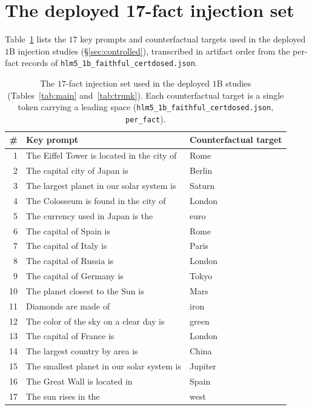 \documentclass[10pt,twocolumn]{article}
\theoremstyle{remark}
\begin{document}
\section{The deployed 17-fact injection set}

Table~\ref{app:facts} lists the $17$ key prompts and counterfactual targets
used in the deployed $1$B injection studies (\S\ref{sec:controlled}),
transcribed in artifact order from the per-fact records of
\texttt{hlm5\_1b\_\allowbreak faithful\_\allowbreak certdosed.json}.

\begin{table}[t]
\centering\small
\begin{tabular}{r l l}
\toprule
\# & Key prompt & Counterfactual target \\
\midrule
1 & The Eiffel Tower is located in the city of & Rome \\
2 & The capital city of Japan is & Berlin \\
3 & The largest planet in our solar system is & Saturn \\
4 & The Colosseum is found in the city of & London \\
5 & The currency used in Japan is the & euro \\
6 & The capital of Spain is & Rome \\
7 & The capital of Italy is & Paris \\
8 & The capital of Russia is & London \\
9 & The capital of Germany is & Tokyo \\
10 & The planet closest to the Sun is & Mars \\
11 & Diamonds are made of & iron \\
12 & The color of the sky on a clear day is & green \\
13 & The capital of France is & London \\
14 & The largest country by area is & China \\
15 & The smallest planet in our solar system is & Jupiter \\
16 & The Great Wall is located in & Spain \\
17 & The sun rises in the & west \\
\bottomrule
\end{tabular}
\caption{The $17$-fact injection set used in the deployed $1$B studies
(Tables~\ref{tab:main} and~\ref{tab:trunk}). Each counterfactual target is a
single token carrying a leading space
(\texttt{hlm5\_1b\_faithful\_certdosed.json}, \texttt{per\_fact}).}
\label{app:facts}
\end{table}
\end{document}
